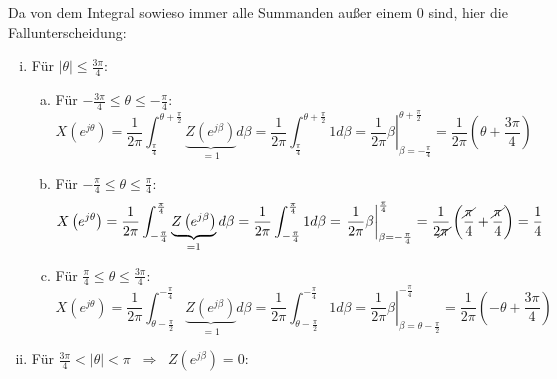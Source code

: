 \begin{uebsp}
\begin{Answer}
\begin{enumerate}[a)]
            Da von dem Integral sowieso immer alle Summanden außer einem 0 sind,
            hier die Fallunterscheidung:
            \begin{enumerate}[i)]
                \item Für $|\theta|\leq\frac{3\pi}{4}$:
                    \begin{enumerate}[a)]
                        \item Für $-\frac{3\pi}{4}\leq\theta\leq-\frac{\pi}{4}$:
                            \[X\left(e^{j\theta}\right)=
                                \frac{1}{2\pi}\int_{\frac{\pi}{4}}^{\theta+\frac{\pi}{2}}\underbrace{Z\left(e^{j\beta}\right)}_{=1}d\beta=
                                \frac{1}{2\pi}\int_{\frac{\pi}{4}}^{\theta+\frac{\pi}{2}}1d\beta=
                                \left.\frac{1}{2\pi}\beta\right|_{\beta=-\frac{\pi}{4}}^{\theta+\frac{\pi}{2}}=
                                \frac{1}{2\pi}\left(\theta+\frac{3\pi}{4}\right)\]
                        \item Für $-\frac{\pi}{4}\leq\theta\leq\frac{\pi}{4}$:
                            \[X\left(e^{j\theta}\right)=
                                \frac{1}{2\pi}\int_{-\frac{\pi}{4}}^{\frac{\pi}{4}}\underbrace{Z\left(e^{j\beta}\right)}_{=1}d\beta=
                                \frac{1}{2\pi}\int_{-\frac{\pi}{4}}^{\frac{\pi}{4}}1d\beta=
                                \left.\frac{1}{2\pi}\beta\right|_{\beta=-\frac{\pi}{4}}^{\frac{\pi}{4}}=
                                \frac{1}{2\cancel\pi}\left(\frac{\cancel\pi}{4}+\frac{\cancel\pi}{4}\right)=\frac{1}{4}\]
                        \item Für $\frac{\pi}{4}\leq\theta\leq\frac{3\pi}{4}$:
                            \[X\left(e^{j\theta}\right)=
                                \frac{1}{2\pi}\int_{\theta-\frac{\pi}{2}}^{-\frac{\pi}{4}}\underbrace{Z\left(e^{j\beta}\right)}_{=1}d\beta=
                                \frac{1}{2\pi}\int_{\theta-\frac{\pi}{2}}^{-\frac{\pi}{4}}1d\beta=
                                \left.\frac{1}{2\pi}\beta\right|_{\beta=\theta-\frac{\pi}{2}}^{-\frac{\pi}{4}}=
                                \frac{1}{2\pi}\left(-\theta+\frac{3\pi}{4}\right)\]
                    \end{enumerate}
                \item Für $\frac{3\pi}{4}< |\theta|<
                    \pi\;\;\Rightarrow\;\;Z(e^{j\beta})=0$:
            \end{enumerate}


\end{enumerate}
\end{Answer}
\end{uebsp}
